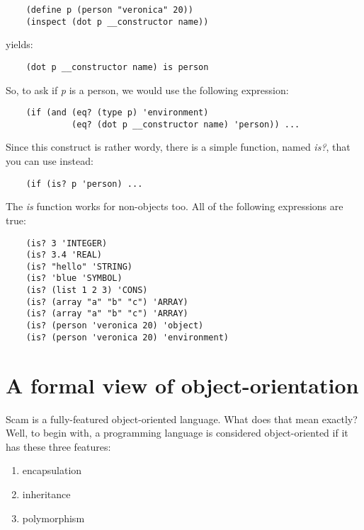 \begin{verbatim}
    (define p (person "veronica" 20))
    (inspect (dot p __constructor name))
\end{verbatim}

yields:

\begin{verbatim}
    (dot p __constructor name) is person
\end{verbatim}

So, to ask if {\it p} is a person, we would use the following
expression:

\begin{verbatim}
    (if (and (eq? (type p) 'environment)
             (eq? (dot p __constructor name) 'person)) ...
\end{verbatim}

Since this construct is rather wordy, there
is a simple function, named {\it is?}, that you can use instead:

\begin{verbatim}
    (if (is? p 'person) ...
\end{verbatim}

The {\it is} function works for non-objects too. All of the following
expressions are true:

\color{CodeGreen}
\begin{codesize}
\begin{verbatim}
    (is? 3 'INTEGER)
    (is? 3.4 'REAL)
    (is? "hello" 'STRING)
    (is? 'blue 'SYMBOL)
    (is? (list 1 2 3) 'CONS)
    (is? (array "a" "b" "c") 'ARRAY)
    (is? (array "a" "b" "c") 'ARRAY)
    (is? (person 'veronica 20) 'object)
    (is? (person 'veronica 20) 'environment)
\end{verbatim}
\end{codesize}
\color{black}

\section{A formal view of object-orientation}

Scam is a fully-featured object-oriented language. What does
that mean exactly? Well, to begin with, a programming language
is considered object-oriented if it has these
three features:

\begin{enumerate}
\item
    encapsulation
\item
    inheritance
\item
    polymorphism
\end{enumerate}

